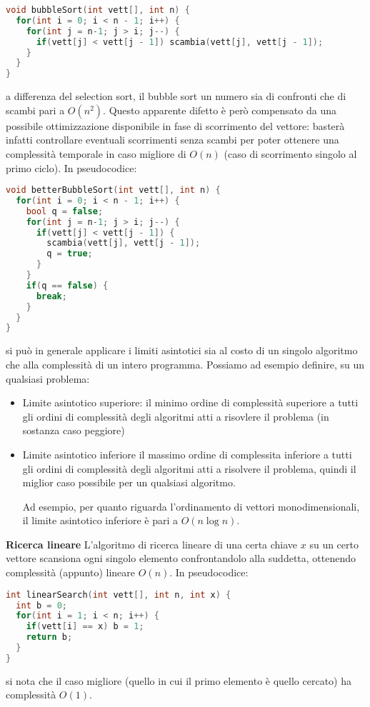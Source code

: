 \documentclass[a4paper,12pt]{article}
\begin{document}
\begin{lstlisting}[language=C++]
void bubbleSort(int vett[], int n) {
  for(int i = 0; i < n - 1; i++) {
    for(int j = n-1; j > i; j--) {
      if(vett[j] < vett[j - 1]) scambia(vett[j], vett[j - 1]);
    }
  }
}
\end{lstlisting}

a differenza del selection sort, il bubble sort un numero sia di confronti che di scambi pari a $O(n^2)$.
Questo apparente difetto è però compensato da una possibile ottimizzazione disponibile in fase di scorrimento del
vettore: basterà infatti controllare eventuali scorrimenti senza scambi per poter ottenere una complessità
temporale in caso migliore di $O(n)$ (caso di scorrimento singolo al primo ciclo). In pseudocodice:

\begin{lstlisting}[language=C++]
void betterBubbleSort(int vett[], int n) {
  for(int i = 0; i < n - 1; i++) {
    bool q = false;
    for(int j = n-1; j > i; j--) {
      if(vett[j] < vett[j - 1]) {
        scambia(vett[j], vett[j - 1]);
        q = true;
      }
    }
    if(q == false) {
      break;
    }
  }
}
\end{lstlisting}

si può in generale applicare i limiti asintotici sia al costo di un singolo algoritmo che alla complessità di 
un intero programma. Possiamo ad esempio definire, su un qualsiasi problema:
\begin{itemize}
  \item Limite asintotico superiore:
    il minimo ordine di complessità superiore a tutti gli ordini di complessità degli algoritmi atti a risovlere
    il problema (in sostanza caso peggiore)
  \item Limite asintotico inferiore
    il massimo ordine di complessita inferiore a tutti gli ordini di complessità degli algoritmi atti a risolvere
    il problema, quindi il miglior caso possibile per un qualsiasi algoritmo. \par
    Ad esempio, per quanto riguarda l'ordinamento di vettori monodimensionali, il limite asintotico inferiore
    è pari a $O(n\log{n})$.
\end{itemize}

\textbf{Ricerca lineare}
L'algoritmo di ricerca lineare di una certa chiave $x$ su un certo vettore scansiona ogni singolo elemento confrontandolo
alla suddetta, ottenendo complessità (appunto) lineare $O(n)$.
In pseudocodice:
\begin{lstlisting}[language=C++]
int linearSearch(int vett[], int n, int x) {
  int b = 0;
  for(int i = 1; i < n; i++) {
    if(vett[i] == x) b = 1;
    return b;
  }
}
\end{lstlisting}
si nota che il caso migliore (quello in cui il primo elemento è quello cercato) ha complessità $O(1)$.
\par \medskip
\end{document}
